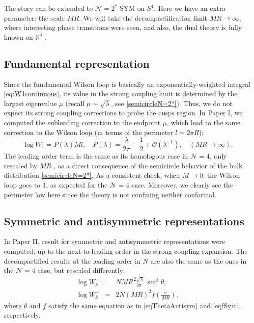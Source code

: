 The story can be extended to $\mathcal{N}=2^*$ SYM on $S^4$.
Here we have an extra parameter: the scale $MR$.
We will take the decompactification limit $MR \rightarrow \infty$, where interesting phase transitions were seen, 
and also, the dual theory is fully known on $\mathbb{R}^4$ \cite{Pilch:2000ue}.



\subsection{Fundamental representation}

Since the fundamental Wilson loop is basically an exponentially-weighted integral \eqref{eq:W1continuous},
its value in the strong coupling limit is determined by the largest eigenvalue $\mu$
(recall $\mu\sim\sqrt{\lambda}$, see \eqref{semicircleN=2*}). 
Thus, we do not expect its strong coupling corrections to probe the cusps region.
In Paper I, we computed the subleading correction to the endpoint $\mu$,
which lead to the same correction to the Wilson loop (in terms of the perimeter $l=2\pi R$):
\begin{equation}\label{WLFundN2}
 \log W_1= P(\lambda) Ml, \quad P(\lambda) = \frac{\lambda}{2 \pi} -\frac{1}{2} + \mathcal{O}(\lambda^{-1}), 
 \quad (MR\rightarrow \infty).
\end{equation}
The leading order term is the same as its homologous case in $\mathcal{N}=4$, only rescaled by $MR$ \cite{Buchel:2013id},
as a direct consequence of the semicircle behavior of the bulk distribution \eqref{semicircleN=2*}.
As a consistent check, when $M\rightarrow 0$, the Wilson loop goes to 1, as expected for the $\mathcal{N}=4$ case.
Moreover, we clearly see the perimeter law here since the theory is not confining neither conformal.



\subsection{Symmetric and antisymmetric representations}
In Paper II, result for symmetric and antisymmetric representations were computed,
up to the next-to-leading order in the strong coupling expansion.
The decompactified results at the leading order in $N$ are also the same as the ones in the $\mathcal{N}=4$ case,
but rescaled differently:
\begin{eqnarray}
 \log W_{k}^- &=& N M R\frac{2\sqrt{\lambda }}{3\pi}\,\sin^3\theta,\\
 \log W_{k}^+ &=& 2 N (MR)^2 f\left(\frac{\kappa}{M R}\right),
\end{eqnarray}
where $\theta$ and  $f$ satisfy the same equation as in \eqref{eqThetaAntisym} and \eqref{eqfSym}, respectively.

